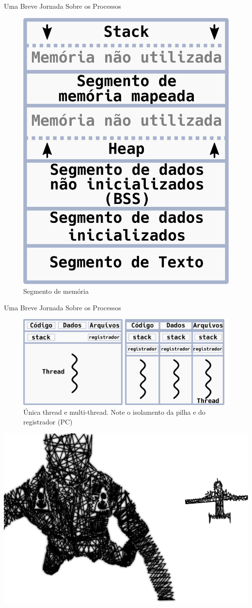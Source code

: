 \documentclass[xcolor={usenames,svgnames,dvipsnames},brazil,english,12pt,aspectratio=149]{beamer}
\begin{document}
\begin{frame}{Uma Breve Jornada Sobre os Processos}
  \begin{figure}[!h]
    \centering
    \includegraphics[width=.4\textwidth]{memory_segment}
    \caption*{Segmento de memória}
  \end{figure}
\end{frame}

\begin{frame}{Uma Breve Jornada Sobre os Processos}
  \begin{figure}[!h]
    \centering
    \includegraphics[width=.7\textwidth]{process_and_threads}
    \caption*{Única thread e multi-thread. Note o isolamento da pilha e do registrador (PC)}
  \end{figure}
\end{frame}

\begin{frame}[plain]
  \includegraphics[width=\textwidth]{presentation_sec_two}
\end{frame}
\end{document}

